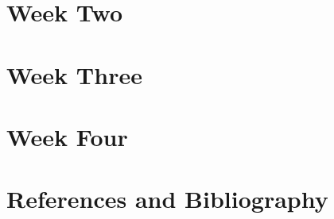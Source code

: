 \documentclass[11pt]{article}
\begin{document}
\newpage
\section{Week Two}


\newpage
\section{Week Three}


\newpage
\section{Week Four}



















\section{References and Bibliography}






\end{document}

